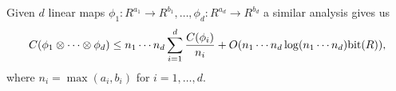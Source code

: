 \begin{lemma}\label{lem:multi-dim-dft}
    Given $d$ linear maps $\phi_1: R^{a_1} \to R^{b_1}, \ldots, \phi_d: R^{a_d} \to R^{b_d}$ a similar analysis gives us
    \[
        C(\phi_1 \otimes \cdots \otimes \phi_d) \leq n_1\cdots n_d \sum^d_{i = 1} \frac{C(\phi_i)}{n_i} + O(n_1\cdots n_d \log (n_1 \cdots n_d) \textrm{bit}(R)),
    \]
    where $n_i = \max(a_i, b_i)$ for $i = 1, \ldots, d$.
\end{lemma}







